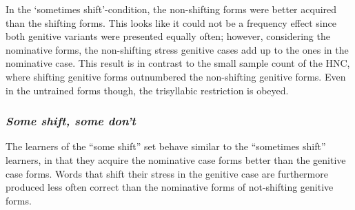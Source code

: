 \documentclass[a4paper]{article}
\begin{document}
In the ‘sometimes shift’-condition, the non-shifting forms were better acquired than the shifting forms. This looks like it could not be a frequency effect since both genitive variants were presented equally often; however, considering the nominative forms, the non-shifting stress genitive cases add up to the ones in the nominative case. This result is in contrast to the small sample count of the HNC, where shifting genitive forms outnumbered the non-shifting genitive forms. Even in the untrained forms though, the trisyllabic restriction is obeyed.

\subsubsection{
\textit{Some shift}\textit{, some don’t}}

The learners of the “some shift” set behave similar to the “sometimes shift” learners, in that they acquire the nominative case forms better than the genitive case forms. Words that shift their stress in the genitive case are furthermore produced less often correct than the nominative forms of not-shifting genitive forms.
\end{document}
